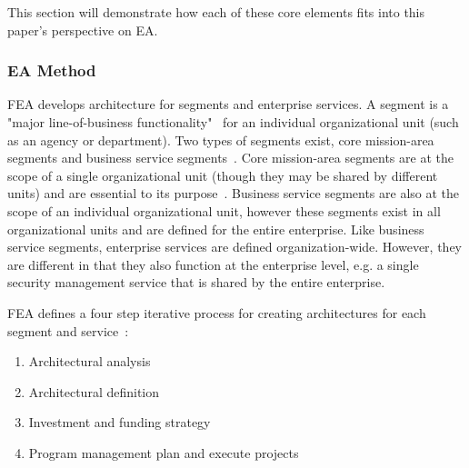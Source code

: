 This section will demonstrate how each of these core elements fits into this paper's perspective on EA.

\subsubsection{EA Method    }


FEA develops architecture for segments and enterprise services. A segment is a "major line-of-business functionality"~\cite{sessions2007} for an individual organizational unit (such as an agency or department). Two types of segments exist, core mission-area segments and business service segments~\cite{FederalEnterpriseArchitectureProgramManagementOffice2007}. Core mission-area segments are at the scope of a single organizational unit (though they may be shared by different units) and are essential to its purpose~\cite{sessions2007,FederalEnterpriseArchitectureProgramManagementOffice2007}. Business service segments are also at the scope of an individual organizational unit, however these segments exist in all organizational units and are defined for the entire enterprise. Like business service segments, enterprise services are defined organization-wide. However, they are different in that they also function at the enterprise level, e.g. a single security management service that is shared by the entire enterprise. 

%
%

 
FEA defines a four step iterative process for creating architectures for each segment and service~\cite{FederalEnterpriseArchitectureProgramManagementOffice2007}:
\begin{enumerate}
    \item Architectural analysis
    \item Architectural definition
    \item Investment and funding strategy
    \item Program management plan and execute projects
\end{enumerate}

